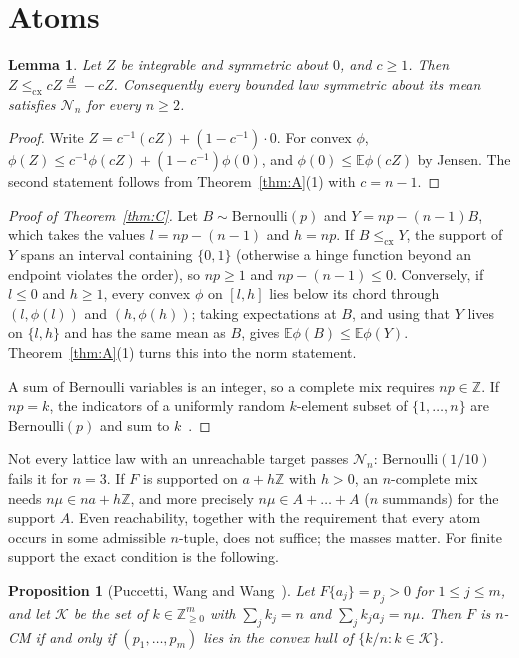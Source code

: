 \documentclass[11pt]{amsart}
\newtheorem{proposition}[theorem]{Proposition}
\newtheorem{lemma}[theorem]{Lemma}
\theoremstyle{definition}
\newcommand{\E}{\mathbb{E}}
\newcommand{\Z}{\mathbb{Z}}
\newcommand{\cx}{\le_{\mathrm{cx}}}
\newcommand{\eqd}{\stackrel{d}{=}}
\newcommand{\cN}{\mathcal{N}}
\begin{document}
\section{Atoms}\label{sec:atoms}

\begin{lemma}\label{lem:sym}
Let $Z$ be integrable and symmetric about $0$, and $c\ge1$. Then $Z\cx cZ\eqd-cZ$. Consequently every bounded law
symmetric about its mean satisfies $\cN_n$ for every $n\ge2$.
\end{lemma}

\begin{proof}
Write $Z=c^{-1}(cZ)+(1-c^{-1})\cdot0$. For convex $\phi$, $\phi(Z)\le c^{-1}\phi(cZ)+(1-c^{-1})\phi(0)$, and
$\phi(0)\le\E\phi(cZ)$ by Jensen. The second statement follows from Theorem~\ref{thm:A}(1) with $c=n-1$.
\end{proof}

\begin{proof}[Proof of Theorem~\ref{thm:C}]
Let $B\sim\mathrm{Bernoulli}(p)$ and $Y=np-(n-1)B$, which takes the values $l=np-(n-1)$ and $h=np$. If $B\cx Y$, the
support of $Y$ spans an interval containing $\{0,1\}$ (otherwise a hinge function beyond an endpoint violates the
order), so $np\ge1$ and $np-(n-1)\le0$. Conversely, if $l\le0$ and $h\ge1$, every convex $\phi$ on $[l,h]$ lies below
its chord through $(l,\phi(l))$ and $(h,\phi(h))$; taking expectations at $B$, and using that $Y$ lives on
$\{l,h\}$ and has the same mean as $B$, gives $\E\phi(B)\le\E\phi(Y)$. Theorem~\ref{thm:A}(1) turns this into the
norm statement.

A sum of Bernoulli variables is an integer, so a complete mix requires $np\in\Z$. If $np=k$, the indicators of a
uniformly random $k$-element subset of $\{1,\dots,n\}$ are Bernoulli$(p)$ and sum to $k$~\cite[Proposition~2.3]{WW11}.
\end{proof}

Not every lattice law with an unreachable target passes $\cN_n$: Bernoulli$(1/10)$ fails it for $n=3$. If $F$ is
supported on $a+h\Z$ with $h>0$, an $n$-complete mix needs $n\mu\in na+h\Z$, and more precisely $n\mu\in A+\dots+A$
($n$ summands) for the support $A$. Even reachability, together with the requirement that every atom occurs in some
admissible $n$-tuple, does not suffice; the masses matter. For finite support the exact condition is the following.

\begin{proposition}[{Puccetti, Wang and Wang~\cite[Theorem~3.2(b)]{PWW12}}]\label{prop:pww}
Let $F\{a_j\}=p_j>0$ for $1\le j\le m$, and let $\mathcal K$ be the set of $k\in\Z_{\ge0}^m$ with $\sum_jk_j=n$ and
$\sum_jk_ja_j=n\mu$. Then $F$ is $n$-CM if and only if $(p_1,\dots,p_m)$ lies in the convex hull of
$\{k/n:k\in\mathcal K\}$.
\end{proposition}
\end{document}

